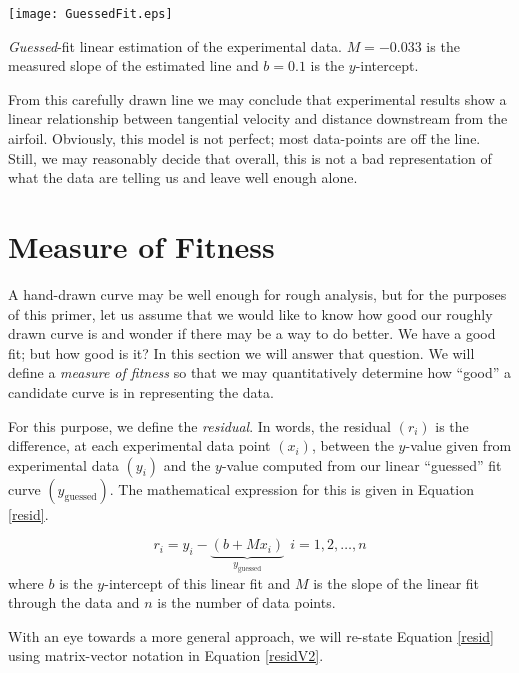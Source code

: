 \begin{marginfigure}
\texttt{[image: GuessedFit.eps]}
\caption{\emph{Guessed}-fit linear estimation of the experimental data.  $M =
  -0.033$ is the measured slope of the estimated line and $b = 0.1$ is the $y$-intercept.}
\label{fig:lec13n-guessedfit}
\end{marginfigure}  

From this carefully drawn line we may conclude that experimental results show a linear
relationship between tangential velocity and distance downstream from the
airfoil.  Obviously, this model is not perfect; most data-points are off the
line.  Still, we may reasonably decide that overall, this is not a bad
representation of what the data are telling us and leave well enough alone.

\section{Measure of Fitness}

A hand-drawn curve may be well enough for rough analysis, but for the purposes of this primer, let us assume that we would like to know how good our roughly drawn curve is and wonder if there may be a way to do better.  We have a good fit; but how good is it?  In this section we will answer that question.  We will define a \emph{measure of fitness} so that we may quantitatively determine how ``good'' a candidate curve is in representing the data.

 
For this purpose, we define the \emph{residual}.  In words, the residual $(r_i)$ is the
difference, at each experimental data point $(x_i)$, between the $y$-value given from experimental data $(y_i)$ and the $y$-value computed from our linear ``guessed'' fit curve $\left(y_{\text{guessed}}\right)$.  The mathematical expression for this is given in Equation \ref{resid}.

\begin{equation}
r_{i} = y_{i} - \underbrace{\left(b + Mx_{i}\right)}_{y_{\text{guessed}}} \ \ i = 1,2,\dots,n
\label{resid}
\end{equation}
where $b$ is the $y$-intercept of this linear fit and $M$ is the slope of
the linear fit through the data
and $n$ is the number of data points.

With an eye towards a more general approach, we will re-state Equation \ref{resid} using matrix-vector notation in Equation \ref{residV2}.

